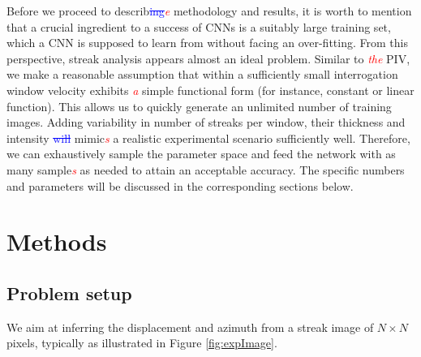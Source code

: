 \documentclass{svjour3}                     %
\newcommand{\new}[1]{\textit{\textcolor{red}{#1}}}
\newcommand{\old}[1]{\textcolor{blue}{\sout{#1}}}
\begin{document}
Before we proceed to describ\old{ing}\new{e} methodology and results, it is worth to mention that a crucial ingredient to a success of CNNs is a suitably large training set, which a CNN is supposed to learn from without facing an over-fitting. From this perspective, streak analysis appears almost an ideal problem. Similar to \new{the} PIV, we make a reasonable assumption that within a sufficiently small interrogation window velocity exhibits \new{a} simple functional form (for instance, constant or linear function). This allows us to quickly generate an unlimited number of training images. Adding variability in number of streaks per window, their thickness and intensity \old{will} mimic\new{s} a realistic experimental scenario sufficiently well. Therefore, we can exhaustively sample the parameter space and feed the network with as many sample\new{s} as needed to attain an acceptable accuracy. The specific numbers and parameters will be discussed in the corresponding sections below.

\section{Methods}
\label{sec:methodology}

\subsection{Problem setup}

We aim at inferring the displacement and azimuth from a streak image of $N \times N$ pixels, typically as illustrated in Figure \ref{fig:expImage}.
\end{document}
